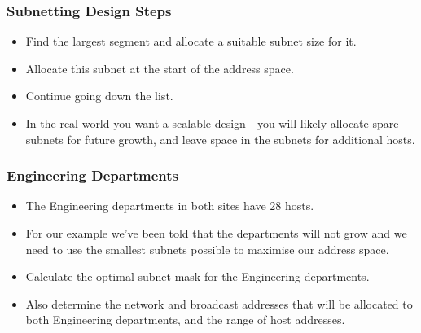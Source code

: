 \documentclass[pdflatex,compress]{beamer}
\begin{document}
\begin{frame}
	\frametitle{Subnetting Design Steps}
	\begin{itemize}
		\item Find the largest segment and allocate a suitable subnet size for it.
		\item Allocate this subnet at the start of the address space.
		\item Continue going down the list.
		\item In the real world you want a scalable design - you will likely allocate spare subnets for future growth, and leave space in the subnets for additional hosts.
	\end{itemize}
\end{frame}

\begin{frame}
	\frametitle{Engineering Departments}
	\begin{itemize}
		\item The Engineering departments in both sites have 28 hosts.
		\item For our example we’ve been told that the departments will not grow and we need to use the smallest subnets possible to maximise our address space.
		\item Calculate the optimal subnet mask for the Engineering departments.
		\item Also determine the network and broadcast addresses that will be allocated to both Engineering departments, and the range of host addresses.
	\end{itemize}
\end{frame}
\end{document}

